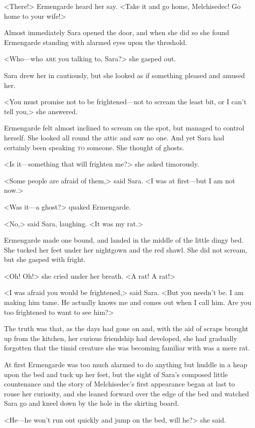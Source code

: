 <There!> Ermengarde heard her say. <Take it and go home, Melchisedec! Go home to your wife!>

Almost immediately Sara opened the door, and when she did so she found Ermengarde standing with alarmed eyes upon the threshold.

<Who—who \textsc{are} you talking to, Sara?> she gasped out.

Sara drew her in cautiously, but she looked as if something pleased and amused her.

<You must promise not to be frightened—not to scream the least bit, or I can't tell you,> she answered.

Ermengarde felt almost inclined to scream on the spot, but managed to control herself. She looked all round the attic and saw no one. And yet Sara had certainly been speaking \textsc{to} someone. She thought of ghosts.

<Is it—something that will frighten me?> she asked timorously.

<Some people are afraid of them,> said Sara. <I was at first—but I am not now.>

<Was it—a ghost?> quaked Ermengarde.

<No,> said Sara, laughing. <It was my rat.>

Ermengarde made one bound, and landed in the middle of the little dingy bed. She tucked her feet under her nightgown and the red shawl. She did not scream, but she gasped with fright.

<Oh! Oh!> she cried under her breath. <A rat! A rat!>

<I was afraid you would be frightened,> said Sara. <But you needn't be. I am making him tame. He actually knows me and comes out when I call him. Are you too frightened to want to see him?>

The truth was that, as the days had gone on and, with the aid of scraps brought up from the kitchen, her curious friendship had developed, she had gradually forgotten that the timid creature she was becoming familiar with was a mere rat.

At first Ermengarde was too much alarmed to do anything but huddle in a heap upon the bed and tuck up her feet, but the sight of Sara's composed little countenance and the story of Melchisedec's first appearance began at last to rouse her curiosity, and she leaned forward over the edge of the bed and watched Sara go and kneel down by the hole in the skirting board.

<He—he won't run out quickly and jump on the bed, will he?> she said.

